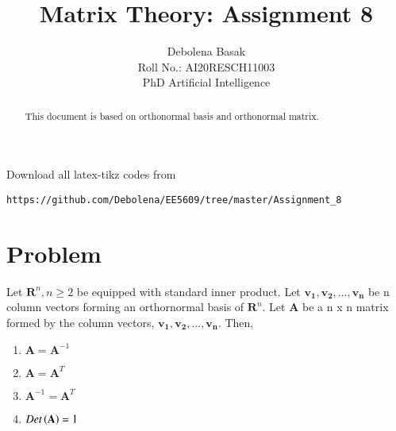 \documentclass[journal,12pt,twocolumn]{IEEEtran}
\begin{document}
\makeatletter
{}
\makeatother
\let\StandardTheFigure\thefigure
\let\vec\mathbf
\renewcommand{\thefigure}{\theproblem}
\def\putbox#1#2#3{\makebox[0in][l]{\makebox[#1][l]{}\raisebox{\baselineskip}[0in][0in]{\raisebox{#2}[0in][0in]{#3}}}}
     \def\rightbox#1{\makebox[0in][r]{#1}}
     \def\centbox#1{\makebox[0in]{#1}}
     \def\topbox#1{\raisebox{-\baselineskip}[0in][0in]{#1}}
     \def\midbox#1{\raisebox{-0.5\baselineskip}[0in][0in]{#1}}
\vspace{3cm}
\title{Matrix Theory: Assignment 8}
\author{Debolena Basak\\ Roll No.: AI20RESCH11003\\ PhD Artificial Intelligence}

\maketitle
\newpage
\bigskip
\renewcommand{\thefigure}{\theenumi}
\renewcommand{\thetable}{\theenumi}


\begin{abstract}
This document is based on orthonormal basis and orthonormal matrix.
\end{abstract}

%
Download all latex-tikz codes from 
%
\begin{lstlisting}
https://github.com/Debolena/EE5609/tree/master/Assignment_8
\end{lstlisting}
%
\section{Problem}
Let $\vec R^n, n\geq 2$ be equipped with standard inner product. Let $\vec {v_1, v_2,..., v_n}$ be n column vectors forming an orthornormal basis of $\vec R^n$. Let $\vec A$ be a n x n matrix formed by the column vectors, $\vec {v_1, v_2,..., v_n}$. Then, 
\begin{enumerate}
    \item $\vec A = \vec A^{-1}$
    \item $\vec A= \vec A^T$
    \item $\vec A^{-1}= \vec A^T $
    \item $Det\brak{\vec A} = 1 $
\end{enumerate}
\end{document}
